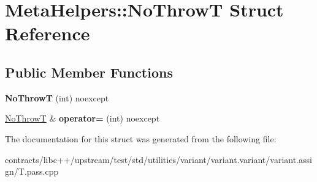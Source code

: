\hypertarget{struct_meta_helpers_1_1_no_throw_t}{}\section{Meta\+Helpers\+:\+:No\+ThrowT Struct Reference}
\label{struct_meta_helpers_1_1_no_throw_t}
\subsection*{Public Member Functions}
\begin{DoxyCompactItemize}
\item 
\mbox{\label{struct_meta_helpers_1_1_no_throw_t_ad264817ab21269ef786b74d7416fbee7}} 
{\bfseries No\+ThrowT} (int) noexcept
\item 
\mbox{\label{struct_meta_helpers_1_1_no_throw_t_accca7d4f87cdf56ba799253d17606d15}} 
\mbox{\hyperlink{struct_meta_helpers_1_1_no_throw_t}{No\+ThrowT}} \& {\bfseries operator=} (int) noexcept
\end{DoxyCompactItemize}


The documentation for this struct was generated from the following file\+:\begin{DoxyCompactItemize}
\item 
contracts/libc++/upstream/test/std/utilities/variant/variant.\+variant/variant.\+assign/T.\+pass.\+cpp\end{DoxyCompactItemize}

